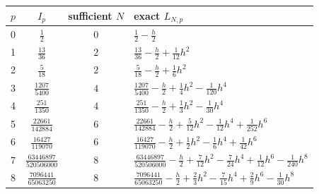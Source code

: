 \begin{tabular}{c c c l}
\toprule
$p$ & $I_p$ & sufficient $N$ & exact $L_{N,p}$ \\
\midrule
0 & $\frac{1}{2}$ & $0$ & $\frac{1}{2}-\frac{h}{2}$ \\
1 & $\frac{13}{36}$ & $2$ & $\frac{13}{36}-\frac{h}{2} + \frac{1}{12}h^{2}$ \\
2 & $\frac{5}{18}$ & $2$ & $\frac{5}{18}-\frac{h}{2} + \frac{1}{6}h^{2}$ \\
3 & $\frac{1207}{5400}$ & $4$ & $\frac{1207}{5400}-\frac{h}{2} + \frac{1}{4}h^{2} - \frac{1}{120}h^{4}$ \\
4 & $\frac{251}{1350}$ & $4$ & $\frac{251}{1350}-\frac{h}{2} + \frac{1}{3}h^{2} - \frac{1}{30}h^{4}$ \\
5 & $\frac{22661}{142884}$ & $6$ & $\frac{22661}{142884}-\frac{h}{2} + \frac{5}{12}h^{2} - \frac{1}{12}h^{4} + \frac{1}{252}h^{6}$ \\
6 & $\frac{16427}{119070}$ & $6$ & $\frac{16427}{119070}-\frac{h}{2} + \frac{1}{2}h^{2} - \frac{1}{6}h^{4} + \frac{1}{42}h^{6}$ \\
7 & $\frac{63446897}{520506000}$ & $8$ & $\frac{63446897}{520506000}-\frac{h}{2} + \frac{7}{12}h^{2} - \frac{7}{24}h^{4} + \frac{1}{12}h^{6} - \frac{1}{240}h^{8}$ \\
8 & $\frac{7096441}{65063250}$ & $8$ & $\frac{7096441}{65063250}-\frac{h}{2} + \frac{2}{3}h^{2} - \frac{7}{15}h^{4} + \frac{2}{9}h^{6} - \frac{1}{30}h^{8}$ \\
\bottomrule
\end{tabular}
